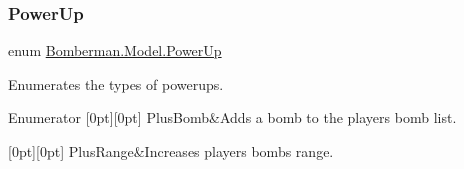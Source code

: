 \subsubsection{\texorpdfstring{PowerUp}{PowerUp}}
{\footnotesize\ttfamily enum \mbox{\hyperlink{namespace_bomberman_1_1_model_a698c97744bc885fe16cc6f385fc501ef}{Bomberman.\+Model.\+Power\+Up}}\hspace{0.3cm}{\ttfamily [strong]}}



Enumerates the types of powerups. 

\begin{DoxyEnumFields}{Enumerator}
[0pt][0pt]{}\mbox{\label{namespace_bomberman_1_1_model_a698c97744bc885fe16cc6f385fc501efa175c9c587bfe0d4887e1401c8df4f181}} 
Plus\+Bomb&Adds a bomb to the player\textquotesingle{}s bomb list. \\
\hline

[0pt][0pt]{}\mbox{\label{namespace_bomberman_1_1_model_a698c97744bc885fe16cc6f385fc501efa0db7259f75c4c771f1c1ac569d6cac95}} 
Plus\+Range&Increases player\textquotesingle{}s bombs\textquotesingle{} range. \\
\hline

\end{DoxyEnumFields}
